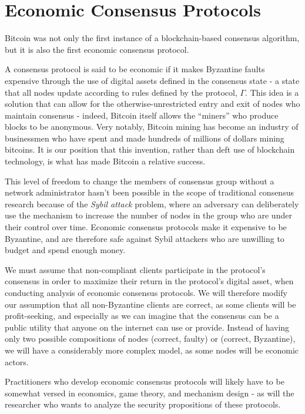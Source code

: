 \documentclass[11pt,a4paper]{article}
\theoremstyle{plain}
\theoremstyle{definition}
\begin{document}
\section{Economic Consensus Protocols} 

Bitcoin was not only the first instance of a blockchain-based consensus algorithm, but it is also the first economic consensus protocol.

A consensus protocol is said to be economic if it makes Byzantine faults expensive through the use of digital assets defined in the consensus state - a state that all nodes update according to rules defined by the protocol, $\Gamma$. This idea is a solution that can allow for the otherwise-unrestricted entry and exit of nodes who maintain consensus - indeed, Bitcoin itself allows the ``miners'' who produce blocks to be anonymous. Very notably, Bitcoin mining has become an industry of businessmen who have spent and made hundreds of millions of dollars mining bitcoins. It is our position that this invention, rather than deft use of blockchain technology, is what has made Bitcoin a relative success.

This level of freedom to change the members of consensus group without a network administrator hasn't been possible in the scope of traditional consensus research because of the \emph{Sybil attack} problem, where an adversary can deliberately use the mechanism to increase the number of nodes in the group who are under their control over time. Economic consensus protocols make it expensive to be Byzantine, and are therefore safe against Sybil attackers who are unwilling to budget and spend enough money. 

We must assume that non-compliant clients participate in the protocol's consensus in order to maximize their return in the protocol's digital asset, when conducting analysis of economic consensus protocols. We will therefore modify our assumption that all non-Byzantine clients are correct, as some clients will be profit-seeking, and especially as we can imagine that the consensus can be a public utility that anyone on the internet can use or provide. Instead of having only two possible compositions of nodes (correct, faulty) or (correct, Byzantine), we will have a considerably more complex model, as some nodes will be economic actors. 

Practitioners who develop economic consensus protocols will likely have to be somewhat versed in economics, game theory, and mechanism design - as will the researcher who wants to analyze the security propositions of these protocols.
\end{document}

